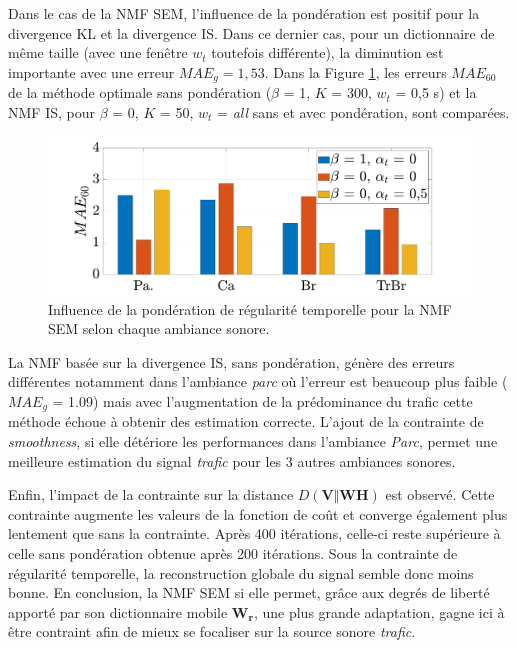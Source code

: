 Dans le cas de la NMF SEM, l'influence de la pondération est positif pour la divergence KL et la divergence IS. Dans ce dernier cas, pour un dictionnaire de même taille (avec une fenêtre $w_t$ toutefois différente), la diminution est importante avec une erreur $MAE_g = 1,53$. 
Dans la Figure \ref{fig:smoothMAE60}, les erreurs $MAE_{60}$ de la méthode optimale sans pondération ($\beta$ = 1, $K$ = 300, $w_t$ = 0,5 s) et la NMF IS, pour $\beta$ = 0, $K$ = 50, $w_t$ = \textit{all} sans et avec pondération, sont comparées. 

\begin{figure}[h!]
\centering
\includegraphics[width=.9\linewidth]{./figures/resultats/grafic_smooth_bar.pdf}
\caption{Influence de la pondération de régularité temporelle pour la NMF SEM selon chaque ambiance sonore.}
\label{fig:smoothMAE60}
\end{figure}

La NMF basée sur la divergence IS, sans pondération, génère des erreurs différentes notamment dans l'ambiance \textit{parc} où l'erreur est beaucoup plus faible ($MAE_g$ = 1.09) mais avec l'augmentation de la prédominance du trafic cette méthode échoue à obtenir des estimation correcte. L'ajout de la contrainte de \textit{smoothness}, si elle détériore les performances dans l'ambiance \textit{Parc}, permet une meilleure estimation du signal \textit{trafic} pour les 3 autres ambiances sonores.

Enfin, l'impact de la contrainte sur la distance $D(\mathbf{V}\Vert \mathbf{WH})$ est observé. Cette contrainte augmente les valeurs de la fonction de coût et converge également plus lentement que sans la contrainte. Après 400 itérations, celle-ci reste supérieure à celle sans pondération obtenue après 200 itérations. Sous la contrainte de régularité temporelle, la reconstruction globale du signal semble donc moins bonne. 
En conclusion, la NMF SEM si elle permet, grâce aux degrés de liberté apporté par son dictionnaire mobile $\mathbf{W_r}$, une plus grande adaptation, gagne ici à être contraint afin de mieux se focaliser sur la source sonore \textit{trafic}.

